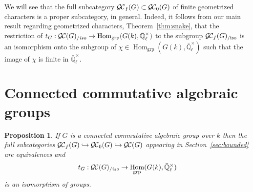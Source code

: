 \documentclass[11pt]{amsart}
\theoremstyle{plain}
\newtheorem{proposition}[theorem]{Proposition}
\theoremstyle{definition}
\theoremstyle{remark}
\newcommand{\EE}{\mathbb{\bar Q}_\ell}
\newcommand{\Fq}{k}
\newcommand{\EEx}{\EE^\times}
\DeclareMathOperator{\Hom}{Hom}
\newcommand{\GC}{{\mathcal{G\hskip-0.8pt C}}}
\newcommand{\GCb}{{\GC_0}}
\newcommand{\GCf}{{\GC_f}}
\newcommand{\GCiso}[1]{\GC(#1)_{/\textit{iso}}}
\newcommand{\GCfiso}[1]{\GCf(#1)_{/\text{iso}}}
\newcommand{\trFrob}[1]{t_{#1}}
\begin{document}
We will see that the full subcategory $\GC_f(G) \subset \GC_0(G)$ of finite geometrized characters is a proper subcategory, in general. Indeed, it follows from our main result regarding geometrized characters, Theorem~\ref{thm:snake}, that the restriction of $\trFrob{G} : \GCiso{G} \to \Hom_\text{grp}(G(\Fq),\EEx)$ to the subgroup $\GCfiso{G}$ is an isomorphism onto the subgroup of $\chi \in \Hom_\text{grp}(G(\Fq),\EEx)$ such that the image of $\chi$ is finite in $\EEx$. 
 
\section{Connected commutative algebraic groups}

%

\begin{proposition}\label{prop:connected}
  If $G$ is a connected commutative algebraic group over $\Fq$ then 
  the full subcategories $\GCf(G) \hookrightarrow \GCb(G) \hookrightarrow \GC(G)$ 
  appearing in Section~\ref{sec:bounded} are equivalences 
  and
  \[
  \trFrob{G} : \GCiso{G} \to \Hom_\text{grp}(G(\Fq),\EEx)
  \]
  is an isomorphism of groups.
\end{proposition}
\end{document}
